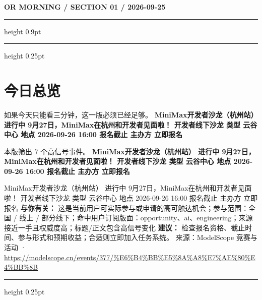 \documentclass[10.5pt]{ctexart}
\begin{document}
{\small\bfseries OR MORNING / SECTION 01 / 2026-09-25}
\vspace{2mm}
\hrule height 0.9pt
\vspace{1.5mm}
\hrule height 0.25pt
\vspace{4mm}
\section*{今日总览}
{\color{ormuted} 如果今天只能看三分钟，这一版必须已经足够。}
\vspace{2mm}
{\fontsize{25}{29}\selectfont\bfseries MiniMax开发者沙龙（杭州站） 进行中 9月27日，MiniMax在杭州和开发者见面啦！ 开发者线下沙龙 类型 云谷中心 地点 2026-09-26 16:00 报名截止 主办方 立即报名}\par
\vspace{2mm}
{\large 本版筛出 7 个高信号事件。}
\vspace{3mm}
{\Large\bfseries MiniMax开发者沙龙（杭州站） 进行中 9月27日，MiniMax在杭州和开发者见面啦！ 开发者线下沙龙 类型 云谷中心 地点 2026-09-26 16:00 报名截止 主办方 立即报名}\par
MiniMax开发者沙龙（杭州站） 进行中 9月27日，MiniMax在杭州和开发者见面啦！ 开发者线下沙龙 类型 云谷中心 地点 2026-09-26 16:00 报名截止 主办方 立即报名
\textbf{与你有关：} 这是当前用户可实际参与或申请的高可触达机会；参与范围：全国 / 线上 / 部分线下；命中用户订阅版面：opportunity、ai、engineering；来源接近一手且权威度高；标题/正文包含高信号变化
\textbf{建议：} 检查报名资格、截止时间、参与形式和预期收益；合适则立即加入任务系统。
{\footnotesize\color{ormuted} 来源：ModelScope 竞赛与活动 · \url{https://modelscope.cn/events/377/%E6%B4%BB%E5%8A%A8%E7%AE%80%E4%BB%8B}}
\vspace{3mm}
\hrule height 0.25pt
\vspace{3mm}
\end{document}
